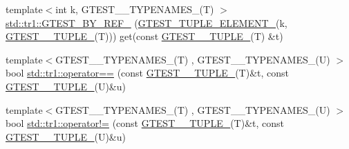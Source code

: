 \begin{DoxyCompactItemize}
\item 
{\footnotesize template$<$int k, G\+T\+E\+S\+T\+\_\+\_\+\+T\+Y\+P\+E\+N\+A\+M\+E\+S\+\_\+(\+T) $>$ }\\\mbox{\hyperlink{namespacestd_1_1tr1_ae7b5ea477ac34a3eef5c4c15c42b76ed}{std\+::tr1\+::\+G\+T\+E\+S\+T\+\_\+\+B\+Y\+\_\+\+R\+E\+F\+\_\+}} (\mbox{\hyperlink{gtest-tuple_8h_a1b7f133d8aa02e0b7afed7b66781eeb7}{G\+T\+E\+S\+T\+\_\+\+T\+U\+P\+L\+E\+\_\+\+E\+L\+E\+M\+E\+N\+T\+\_\+}}(k, \mbox{\hyperlink{gtest-tuple_8h_a275e7bcd84299cc44b9c1dba971951c4}{G\+T\+E\+S\+T\+\_\+\_\+\+T\+U\+P\+L\+E\+\_\+}}(T))) get(const \mbox{\hyperlink{gtest-tuple_8h_a275e7bcd84299cc44b9c1dba971951c4}{G\+T\+E\+S\+T\+\_\+\_\+\+T\+U\+P\+L\+E\+\_\+}}(T) \&t)
\item 
{\footnotesize template$<$G\+T\+E\+S\+T\+\_\+\_\+\+T\+Y\+P\+E\+N\+A\+M\+E\+S\+\_\+(\+T) , G\+T\+E\+S\+T\+\_\+\_\+\+T\+Y\+P\+E\+N\+A\+M\+E\+S\+\_\+(\+U) $>$ }\\bool \mbox{\hyperlink{namespacestd_1_1tr1_af4516de784404381f9b14797694b6311}{std\+::tr1\+::operator==}} (const \mbox{\hyperlink{gtest-tuple_8h_a275e7bcd84299cc44b9c1dba971951c4}{G\+T\+E\+S\+T\+\_\+\_\+\+T\+U\+P\+L\+E\+\_\+}}(T)\&t, const \mbox{\hyperlink{gtest-tuple_8h_a275e7bcd84299cc44b9c1dba971951c4}{G\+T\+E\+S\+T\+\_\+\_\+\+T\+U\+P\+L\+E\+\_\+}}(U)\&u)
\item 
{\footnotesize template$<$G\+T\+E\+S\+T\+\_\+\_\+\+T\+Y\+P\+E\+N\+A\+M\+E\+S\+\_\+(\+T) , G\+T\+E\+S\+T\+\_\+\_\+\+T\+Y\+P\+E\+N\+A\+M\+E\+S\+\_\+(\+U) $>$ }\\bool \mbox{\hyperlink{namespacestd_1_1tr1_a058882c51de469b5e78d29076f864940}{std\+::tr1\+::operator!=}} (const \mbox{\hyperlink{gtest-tuple_8h_a275e7bcd84299cc44b9c1dba971951c4}{G\+T\+E\+S\+T\+\_\+\_\+\+T\+U\+P\+L\+E\+\_\+}}(T)\&t, const \mbox{\hyperlink{gtest-tuple_8h_a275e7bcd84299cc44b9c1dba971951c4}{G\+T\+E\+S\+T\+\_\+\_\+\+T\+U\+P\+L\+E\+\_\+}}(U)\&u)
\end{DoxyCompactItemize}
